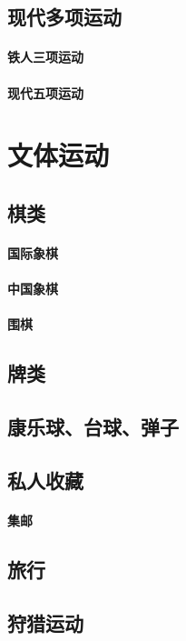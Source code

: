 \documentclass[UTF8]{../../ApplicationUniverse}
\begin{document}
\section{现代多项运动}
    \subsubsection{铁人三项运动}
    \subsubsection{现代五项运动}







\chapter{文体运动}
\section{棋类}
    \subsubsection{国际象棋}
    \subsubsection{中国象棋}
    \subsubsection{围棋}

\section{牌类}
\section{康乐球、台球、弹子}
\section{私人收藏}
    \subsubsection{集邮}
\section{旅行}
\section{狩猎运动}
\end{document}
